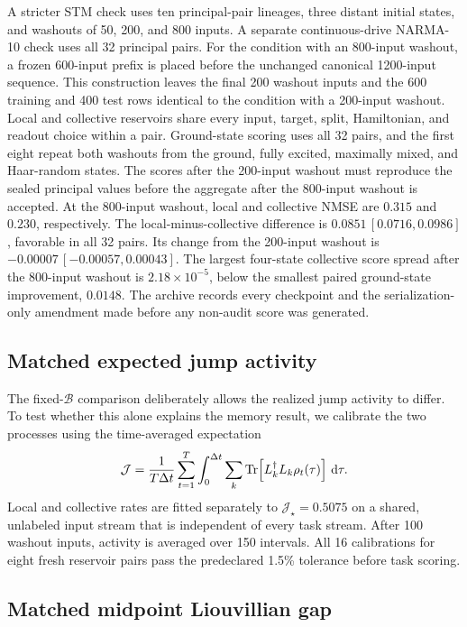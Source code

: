 A stricter STM check uses ten principal-pair lineages, three distant initial
states, and washouts of 50, 200, and 800 inputs. A separate continuous-drive
NARMA-10 check uses all 32 principal pairs. For the condition with an
800-input washout, a frozen
600-input prefix is placed before the unchanged canonical 1200-input sequence.
This construction leaves the final 200 washout inputs and the 600 training and
400 test rows identical to the condition with a 200-input washout. Local and
collective reservoirs share every input, target,
split, Hamiltonian, and readout choice within a pair. Ground-state scoring uses
all 32 pairs, and the first eight repeat both washouts from the ground, fully
excited, maximally mixed, and Haar-random states. The scores after the 200-input washout
must reproduce the sealed principal values before the aggregate after the
800-input washout is accepted. At the 800-input washout,
local and collective NMSE are \(0.315\) and \(0.230\), respectively. The
local-minus-collective difference is \(0.0851\,[0.0716,0.0986]\), favorable in
all 32 pairs. Its change from the 200-input washout is
\(-0.00007\,[-0.00057,0.00043]\). The largest four-state collective score spread
after the 800-input washout is \(2.18\times10^{-5}\), below the smallest paired ground-state
improvement, \(0.0148\). The archive records every checkpoint and the
serialization-only amendment made before any non-audit score was generated.

\subsection{Matched expected jump activity}
\label{app:activity-control}

The fixed-\(\mathcal B\) comparison deliberately allows the realized jump
activity to differ.  To test whether this alone explains the memory result,
we calibrate the two processes using the time-averaged expectation
\[
\mathcal J=\frac{1}{T\Delta t}\sum_{t=1}^{T}\int_0^{\Delta t}
\sum_k\operatorname{Tr}\!\left[L_k^\dagger L_k\rho_t(\tau)\right]\,\mathrm d\tau .
\]
Local and collective rates are fitted separately to
\(\mathcal J_\star=0.5075\) on a shared, unlabeled input stream that is
independent of every task stream.  After 100 washout inputs, activity is
averaged over 150 intervals.  All 16 calibrations for eight fresh reservoir
pairs pass the predeclared 1.5\% tolerance before task scoring.

\subsection{Matched midpoint Liouvillian gap}
\label{app:gap-control}

